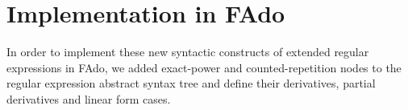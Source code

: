 








\section{Implementation in FAdo}
In order to implement these new syntactic constructs of extended regular expressions in FAdo, we added exact-power and counted-repetition nodes to the regular expression abstract syntax tree and define their derivatives, partial derivatives and linear form cases.

